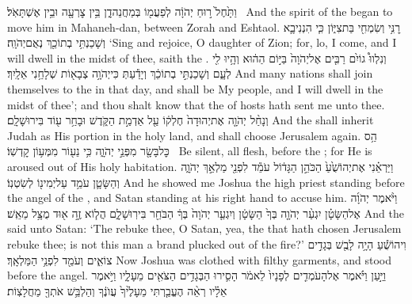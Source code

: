 {וַתָּ֙חֶל֙ ר֣וּחַ יְהֹוָ֔ה לְפַעֲמ֖וֹ בְּמַחֲנֵה\maqqaf דָ֑ן בֵּ֥ין צׇרְעָ֖ה וּבֵ֥ין אֶשְׁתָּאֹֽל׃ \petucha }
{And the spirit of the \lord\space began to move him in Mahaneh-dan, between Zorah and Eshtaol.}
\label{haft_36}
\setcounter{chap}{2}
\setcounter{verse}{14}
{רׇנִּ֥י וְשִׂמְחִ֖י בַּת\maqqaf צִיּ֑וֹן כִּ֧י הִנְנִי\maqqaf בָ֛א וְשָׁכַנְתִּ֥י בְתוֹכֵ֖ךְ נְאֻם\maqqaf יְהֹוָֽה׃}
{‘Sing and rejoice, O daughter of Zion; for, lo, I come, and I will dwell in the midst of thee, saith the \lord.}
{וְנִלְווּ֩ גוֹיִ֨ם רַבִּ֤ים אֶל\maqqaf יְהֹוָה֙ בַּיּ֣וֹם הַה֔וּא וְהָ֥יוּ לִ֖י לְעָ֑ם וְשָׁכַנְתִּ֣י בְתוֹכֵ֔ךְ וְיָדַ֕עַתְּ כִּי\maqqaf יְהֹוָ֥ה צְבָא֖וֹת שְׁלָחַ֥נִי אֵלָֽיִךְ׃}
{And many nations shall join themselves to the \lord\space in that day, and shall be My people, and I will dwell in the midst of thee’; and thou shalt know that the \lord\space of hosts hath sent me unto thee.}
{וְנָחַ֨ל יְהֹוָ֤ה אֶת\maqqaf יְהוּדָה֙ חֶלְק֔וֹ עַ֖ל אַדְמַ֣ת הַקֹּ֑דֶשׁ וּבָחַ֥ר ע֖וֹד בִּירוּשָׁלָֽ͏ִם׃}
{And the \lord\space shall inherit Judah as His portion in the holy land, and shall choose Jerusalem again.}
{הַ֥ס כׇּל\maqqaf בָּשָׂ֖ר מִפְּנֵ֣י יְהֹוָ֑ה כִּ֥י נֵע֖וֹר מִמְּע֥וֹן קׇדְשֽׁוֹ׃ \petucha }
{Be silent, all flesh, before the \lord; for He is aroused out of His holy habitation.}
\newperek
{}
{וַיַּרְאֵ֗נִי אֶת\maqqaf יְהוֹשֻׁ֙עַ֙ הַכֹּהֵ֣ן הַגָּד֔וֹל עֹמֵ֕ד לִפְנֵ֖י מַלְאַ֣ךְ יְהֹוָ֑ה וְהַשָּׂטָ֛ן עֹמֵ֥ד עַל\maqqaf יְמִינ֖וֹ לְשִׂטְנֽוֹ׃}
{And he showed me Joshua the high priest standing before the angel of the \lord, and Satan standing at his right hand to accuse him.}
{וַיֹּ֨אמֶר יְהֹוָ֜ה אֶל\maqqaf הַשָּׂטָ֗ן יִגְעַ֨ר יְהֹוָ֤ה בְּךָ֙ הַשָּׂטָ֔ן וְיִגְעַ֤ר יְהֹוָה֙ בְּךָ֔ הַבֹּחֵ֖ר בִּירֽוּשָׁלָ֑͏ִם הֲל֧וֹא זֶ֦ה א֖וּד מֻצָּ֥ל מֵאֵֽשׁ׃}
{And the \lord\space said unto Satan: ‘The \lord\space rebuke thee, O Satan, yea, the \lord\space that hath chosen Jerusalem rebuke thee; is not this man a brand plucked out of the fire?’}
{וִיהוֹשֻׁ֕עַ הָיָ֥ה לָבֻ֖שׁ בְּגָדִ֣ים צוֹאִ֑ים וְעֹמֵ֖ד לִפְנֵ֥י הַמַּלְאָֽךְ׃}
{Now Joshua was clothed with filthy garments, and stood before the angel.}
{וַיַּ֣עַן וַיֹּ֗אמֶר אֶל\maqqaf הָעֹמְדִ֤ים לְפָנָיו֙ לֵאמֹ֔ר הָסִ֛ירוּ הַבְּגָדִ֥ים הַצֹּאִ֖ים מֵעָלָ֑יו וַיֹּ֣אמֶר אֵלָ֗יו רְאֵ֨ה הֶעֱבַ֤רְתִּי מֵעָלֶ֙יךָ֙ עֲוֺנֶ֔ךָ וְהַלְבֵּ֥שׁ אֹתְךָ֖ מַחֲלָצֽוֹת׃}
